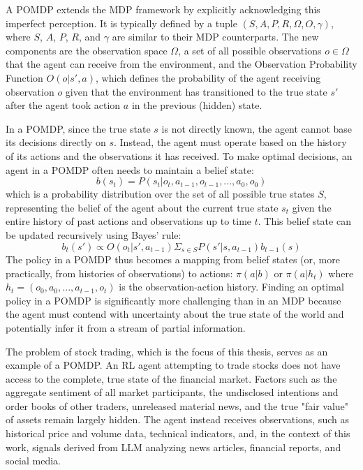A \gls{POMDP} extends the \gls{MDP} framework by explicitly acknowledging this imperfect perception. It is typically defined by a tuple \((S, A, P, R, \Omega, O, \gamma)\), where \(S\), \(A\), \(P\), \(R\), and \(\gamma\) are similar to their \gls{MDP} counterparts. The new components are the observation space \(\Omega\), a set of all possible observations \(o \in \Omega\) that the agent can receive from the environment, and the Observation Probability Function \(O(o | s', a)\), which defines the probability of the agent receiving observation \(o\) given that the environment has transitioned to the true state \(s'\) after the agent took action \(a\) in the previous (hidden) state.

In a \gls{POMDP}, since the true state \(s\) is not directly known, the agent cannot base its decisions directly on \(s\). Instead, the agent must operate based on the history of its actions and the observations it has received. To make optimal decisions, an agent in a POMDP often needs to maintain a belief state:
\[b(s_t) = P(s_t | o_t, a_{t-1}, o_{t-1}, ..., a_0, o_0)\]
which is a probability distribution over the set of all possible true states \(S\), representing the belief of the agent about the current true state \(s_t\) given the entire history of past actions and observations up to time \(t\). This belief state can be updated recursively using Bayes' rule:
\[b_t(s') \propto  O(o_t | s', a_{t-1}) \Sigma_{s \in S} P(s' | s, a_{t-1}) b_{t-1}(s)\]
The policy in a \gls{POMDP} thus becomes a mapping from belief states (or, more practically, from histories of observations) to actions: \(\pi(a | b)\) or \(\pi(a | h_t)\) where \(h_t = (o_0, a_0, ..., a_{t-1}, o_t)\) is the observation-action history. Finding an optimal policy in a \gls{POMDP} is significantly more challenging than in an \gls{MDP} because the agent must contend with uncertainty about the true state of the world and potentially infer it from a stream of partial information.

The problem of stock trading, which is the focus of this thesis, serves as an example of a \gls{POMDP}. An \gls{RL} agent attempting to trade stocks does not have access to the complete, true state of the financial market. Factors such as the aggregate sentiment of all market participants, the undisclosed intentions and order books of other traders, unreleased material news, and the true "fair value" of assets remain largely hidden. The agent instead receives observations, such as historical price and volume data, technical indicators, and, in the context of this work, signals derived from \gls{LLM} analyzing news articles, financial reports, and social media.

